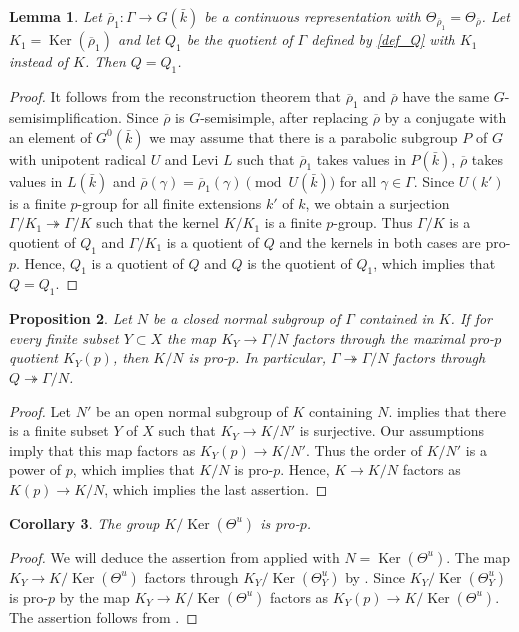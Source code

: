 \documentclass{amsart}
\newtheorem{prop}{Proposition}[section]
\newtheorem{lem}[prop]{Lemma}
\newtheorem{cor}[prop]{Corollary}
\theoremstyle{definition}
\theoremstyle{remark}
\DeclareMathOperator{\Ker}{Ker}
\newcommand{\rhobar}{\overline{\rho}}
\newcommand{\kbar}{\bar{k}}
\begin{document}
\begin{lem}\label{Q_indep} Let $\rhobar_1: \Gamma \rightarrow G(\kbar)$ be a continuous representation with $\Theta_{\rhobar_1}=\Theta_{\rhobar}$. 
Let $K_1=\Ker(\rhobar_1)$ and let $Q_1$ be the quotient of $\Gamma$ defined by \eqref{def_Q} with $K_1$ instead of $K$. 
Then $Q=Q_1$.
\end{lem}
\begin{proof} It follows from the reconstruction theorem that $\rhobar_1$ and $\rhobar$ have the same $G$-semi\-simp\-li\-fi\-cation.
Since $\rhobar$ is $G$-semisimple, after replacing $\rhobar$ by a conjugate with an element of $G^0(\kbar)$ we may assume that 
there is a parabolic subgroup $P$ of $G$ with unipotent radical $U$ and Levi $L$ such that 
$\rhobar_1$ takes values in $P(\kbar)$, $\rhobar$ takes values in $L(\kbar)$ and 
$\rhobar(\gamma) = \rhobar_1(\gamma) \pmod{U(\kbar)}$ for all $\gamma\in \Gamma$. Since  
$U(k')$ is a finite $p$-group for all finite extensions $k'$ of $k$, we obtain a surjection 
$\Gamma/K_1\twoheadrightarrow \Gamma/K$ such that the kernel $K/K_1$ is a finite $p$-group. 
Thus $\Gamma/K$ is a quotient of $Q_1$ and $\Gamma/K_1$ is a quotient of $Q$ and the kernels 
in both cases are pro-$p$. Hence, $Q_1$ is a quotient of $Q$ and $Q$ is the quotient of $Q_1$, 
which implies that $Q=Q_1$.
\end{proof} 

\begin{prop}\label{rewrite} Let $N$ be a closed normal subgroup of $\Gamma$ contained in $K$. If for every finite subset $Y\subset X$ 
the map $K_Y \rightarrow \Gamma/N$ factors through the maximal 
pro-$p$ quotient $K_Y(p)$, then $K/N$ is pro-$p$. In particular, 
$\Gamma \twoheadrightarrow \Gamma/N$ factors through 
$Q\twoheadrightarrow \Gamma/N$. 
\end{prop}
\begin{proof} Let $N'$ be an open normal subgroup of $K$ containing $N$.  implies that there 
is a finite subset $Y$ of $X$ 
such that $K_Y \rightarrow K/N'$ is surjective. Our assumptions imply that this map factors as $K_Y(p)\rightarrow K/N'$. Thus the order of $K/N'$ is
a power of $p$, which implies that 
$K/N$ is pro-$p$. Hence, $K\rightarrow K/N$ factors as $K(p)\rightarrow K/N$, which implies the last assertion.
\end{proof} 

\begin{cor}\label{pro_p} The group $K/\Ker(\Theta^u)$ is pro-$p$.
\end{cor}
\begin{proof} We will deduce the assertion from  applied with $N=\Ker (\Theta^u)$. The map 
$K_Y \rightarrow K/\Ker(\Theta^u)$ 
factors through 
$K_Y/\Ker(\Theta^u_Y)$ by
. Since
$K_Y/\Ker(\Theta^u_Y)$ is pro-$p$ by 
 the map $K_Y \rightarrow K/\Ker(\Theta^u)$ factors 
as $K_Y(p)\rightarrow K/\Ker(\Theta^u)$. The assertion follows from .
\end{proof}
\end{document}
